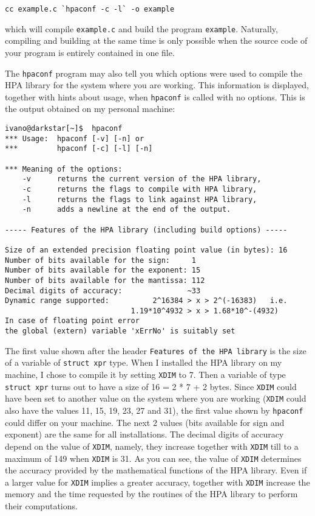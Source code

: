 \documentclass{article}
\begin{document}
\begin{verbatim}
cc example.c `hpaconf -c -l` -o example
\end{verbatim}
which will compile \texttt{example.c} and build the program \texttt{example}.
Naturally, compiling and building at the same time is only
possible when the source code of your program is entirely contained in one
file.

The \texttt{hpaconf} program may also tell you which options were used 
to compile the HPA library for the system where you are working.
This information is displayed, together with hints about usage, when
\texttt{hpaconf} is called with no options. This is the output obtained
on my personal machine:

\begin{verbatim}
ivano@darkstar[~]$  hpaconf 
*** Usage:  hpaconf [-v] [-n] or
***         hpaconf [-c] [-l] [-n]

*** Meaning of the options:
    -v      returns the current version of the HPA library,
    -c      returns the flags to compile with HPA library,
    -l      returns the flags to link against HPA library,
    -n      adds a newline at the end of the output.

----- Features of the HPA library (including build options) -----

Size of an extended precision floating point value (in bytes): 16
Number of bits available for the sign:     1
Number of bits available for the exponent: 15
Number of bits available for the mantissa: 112
Decimal digits of accuracy:               ~33
Dynamic range supported:          2^16384 > x > 2^(-16383)   i.e.
                             1.19*10^4932 > x > 1.68*10^-(4932)
In case of floating point error
the global (extern) variable 'xErrNo' is suitably set
\end{verbatim}
The first value shown after the header \texttt{Features of the HPA library}
is the size of a variable of \texttt{struct xpr} type. When I installed the
HPA library on my machine, I chose to compile it by setting \texttt{XDIM}
to 7. Then a variable of type \texttt{struct xpr} turns out to have a size of
16 = 2 * 7 + 2  bytes.
Since \texttt{XDIM} could have been set to another value on the system
where you are working (\texttt{XDIM} could also have the values
11, 15, 19, 23, 27 and 31), the first value shown by \texttt{hpaconf}
could differ on your machine.
The next 2 values (bits available for sign and exponent) are
the same for all installations.
The decimal digits of accuracy depend on the value of \texttt{XDIM},
namely, they increase together with \texttt{XDIM} till to a maximum of
149 when \texttt{XDIM} is 31. As you can see, the value of \texttt{XDIM}
determines the accuracy provided by the mathematical functions of 
the HPA library. Even if a larger value for \texttt{XDIM} implies 
a greater accuracy, together with \texttt{XDIM} increase the memory
and the time requested by the routines of the HPA library
to perform their computations.
\end{document}
